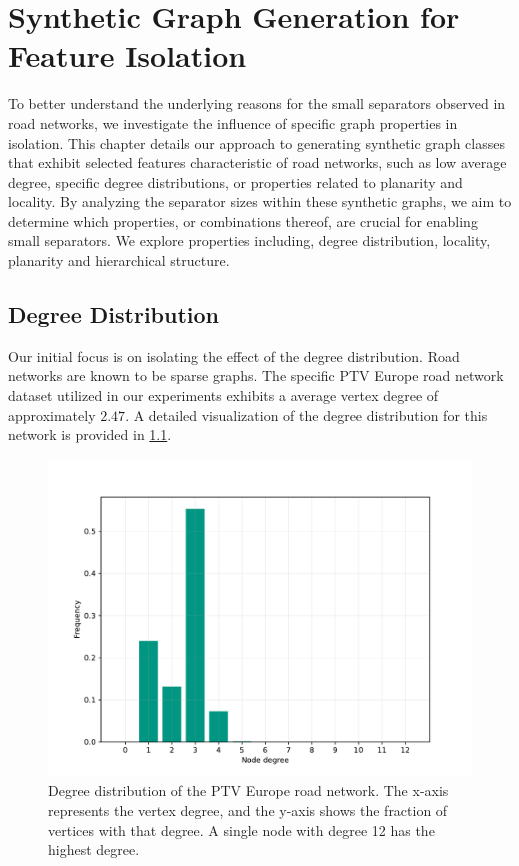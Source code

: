 \chapter{Synthetic Graph Generation for Feature Isolation}

To better understand the underlying reasons for the small separators observed in road networks, we investigate the influence of specific graph properties in isolation.
This chapter details our approach to generating synthetic graph classes that exhibit selected features characteristic of road networks, such as low average degree, specific degree distributions, or properties related to planarity and locality.
By analyzing the separator sizes within these synthetic graphs, we aim to determine which properties, or combinations thereof, are crucial for enabling small separators.
We explore properties including, degree distribution, locality, planarity and hierarchical structure.

\section{Degree Distribution}

Our initial focus is on isolating the effect of the degree distribution.
Road networks are known to be sparse graphs.
The specific PTV Europe road network dataset \cite{ptv_group_dimacs-europe_2009} utilized in our experiments exhibits a average vertex degree of approximately \(2.47\).
A detailed visualization of the degree distribution for this network is provided in \cref{fig:degree_dist_europe}.

\begin{figure}
    \centering
    \includegraphics[width=0.6\linewidth]{graphics/degree_overview_europe.pdf}
    \caption{Degree distribution of the PTV Europe road network. The x-axis represents the vertex degree, and the y-axis shows the fraction of vertices with that degree. A single node with degree 12 has the highest degree.}
    \label{fig:degree_dist_europe}
\end{figure}

